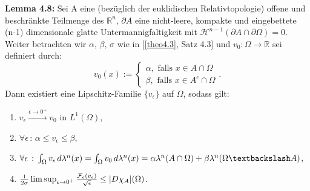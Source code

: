 \colorbox{generalYellow}{\begin{minipage}{16cm}{\textcolor{black}{}{\label{lem4.8}}}
\textbf{Lemma 4.8:} Sei A eine (bezüglich der euklidischen Relativtopologie) offene und beschränkte Teilmenge des \(\mathbb{R}^n\), \(\partial A\) eine nicht-leere, kompakte und eingebettete (n-1) dimensionale glatte Untermannigfaltigkeit mit \(\mathcal{H}^{n-1}(\partial A \cap \partial \Omega) = 0\). Weiter betrachten wir \(\alpha, \, \beta, \, \sigma\) wie in [\ref{theo4.3}, Satz 4.3] und \(v_0 : \Omega \to \mathbb{R}\) sei definiert durch:
\begin{equation}
    v_0(x) := \begin{cases}
        \alpha, \text{ falls }x \in A \cap \Omega \\
        \beta, \text{ falls }x \in A^c \cap \Omega
    \end{cases}.
\end{equation}
Dann existiert eine Lipschitz-Familie \(\{v_{\epsilon}\}\) auf \(\Omega\), sodass gilt:
\begin{enumerate}
    \item \(v_{\epsilon} \stackrel{\epsilon \to 0^+}{\to} v_0\) in \(L^1(\Omega)\),
    \item \(\forall \epsilon \, : \, \alpha \leq v_{\epsilon} \leq \beta\),
    \item \(\forall \epsilon \, : \, \int_{\Omega} v_{\epsilon} \, d\lambda^n(x) = \int_{\Omega} v_0 \, d\lambda^n(x) = \alpha \lambda^n(A \cap \Omega) + \beta \lambda^n(\Omega \textbackslash A)\),
    \item \(\frac{1}{2\sigma} \limsup_{\epsilon \to 0^+} \frac{\mathcal{F}_{\epsilon}(v_{\epsilon})}{\sqrt{\epsilon}} \leq |D\chi_A|(\Omega)\).
\end{enumerate}
\end{minipage}}

